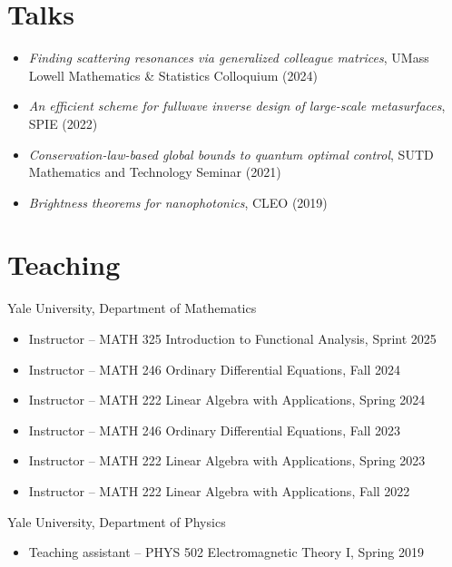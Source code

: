 \documentclass[margin,line,pifont,palatino,courier]{res}
\begin{document}
\begin{resume}
\section{\sc Talks}
\begin{itemize}
	\item \emph{Finding scattering resonances via generalized colleague matrices}, UMass Lowell Mathematics \& Statistics Colloquium (2024)
	\item \emph{An efficient scheme for fullwave inverse design of large-scale metasurfaces}, SPIE (2022)
	\item \emph{Conservation-law-based global bounds to quantum optimal control}, SUTD Mathematics and Technology Seminar (2021)
	\item \emph{Brightness theorems for nanophotonics}, CLEO (2019)
\end{itemize}

\section{\sc Teaching}
Yale University, Department of Mathematics

\begin{itemize}
\setlength\itemsep{0em}
	\item Instructor -- MATH 325 Introduction to Functional Analysis, Sprint 2025
	\item Instructor -- MATH 246 Ordinary Differential Equations, Fall 2024
		\item Instructor -- MATH 222 Linear Algebra with Applications, Spring 2024
	\item Instructor -- MATH 246 Ordinary Differential Equations, Fall 2023
	\item Instructor -- MATH 222 Linear Algebra with Applications, Spring 2023
	\item Instructor -- MATH 222 Linear Algebra with Applications, Fall 2022

\end{itemize}
Yale University, Department of Physics

\begin{itemize}
\setlength\itemsep{0em}
	\item Teaching assistant -- PHYS 502 Electromagnetic Theory I, Spring 2019
\end{itemize}




\end{resume}
\end{document}
